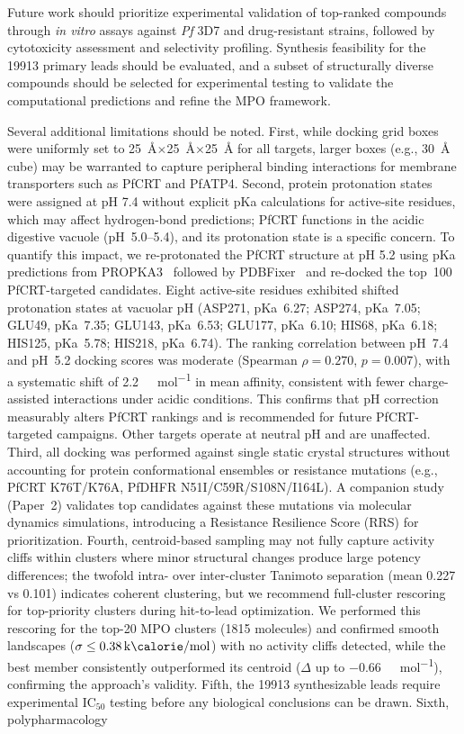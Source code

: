 \documentclass[journal=jcisd8,manuscript=article]{achemso}
\begin{document}
Future work should prioritize experimental validation of top-ranked compounds through \textit{in vitro} assays against \textit{Pf} 3D7 and drug-resistant strains, followed by cytotoxicity assessment and selectivity profiling. Synthesis feasibility for the \num{19913} primary leads should be evaluated, and a subset of structurally diverse compounds should be selected for experimental testing to validate the computational predictions and refine the MPO framework.

Several additional limitations should be noted. First, while docking grid boxes were uniformly set to \qty{25}{\angstrom}$\times$\qty{25}{\angstrom}$\times$\qty{25}{\angstrom} for all targets, larger boxes (e.g., \qty{30}{\angstrom} cube) may be warranted to capture peripheral binding interactions for membrane transporters such as PfCRT and PfATP4. Second, protein protonation states were assigned at pH 7.4 without explicit pKa calculations for active-site residues, which may affect hydrogen-bond predictions; PfCRT functions in the acidic digestive vacuole (pH~5.0--5.4), and its protonation state is a specific concern. To quantify this impact, we re-protonated the PfCRT structure at pH 5.2 using pKa predictions from PROPKA3~\cite{Olsson2011} followed by PDBFixer~\cite{Eastman2017} and re-docked the top~100 PfCRT-targeted candidates. Eight active-site residues exhibited shifted protonation states at vacuolar pH (ASP271, pKa~6.27; ASP274, pKa~7.05; GLU49, pKa~7.35; GLU143, pKa~6.53; GLU177, pKa~6.10; HIS68, pKa~6.18; HIS125, pKa~5.78; HIS218, pKa~6.74). The ranking correlation between pH~7.4 and pH~5.2 docking scores was moderate (Spearman $\rho = \num{0.270}$, $p = \num{0.007}$), with a systematic shift of \qty{+2.2}{\kilo\calorie\per\mole} in mean affinity, consistent with fewer charge-assisted interactions under acidic conditions. This confirms that pH correction measurably alters PfCRT rankings and is recommended for future PfCRT-targeted campaigns. Other targets operate at neutral pH and are unaffected. Third, all docking was performed against single static crystal structures without accounting for protein conformational ensembles or resistance mutations (e.g., PfCRT K76T/K76A, PfDHFR N51I/C59R/S108N/I164L). A companion study (Paper~2) validates top candidates against these mutations via molecular dynamics simulations, introducing a Resistance Resilience Score (RRS) for prioritization. Fourth, centroid-based sampling may not fully capture activity cliffs within clusters where minor structural changes produce large potency differences; the twofold intra- over inter-cluster Tanimoto separation (mean \num{0.227} vs \num{0.101}) indicates coherent clustering, but we recommend full-cluster rescoring for top-priority clusters during hit-to-lead optimization. We performed this rescoring for the top-20 MPO clusters (\num{1815} molecules) and confirmed smooth landscapes ($\sigma \leq \qty{0.38}{\kilo\calorie\per\mole}$) with no activity cliffs detected, while the best member consistently outperformed its centroid ($\Delta$ up to \qty{-0.66}{\kilo\calorie\per\mole}), confirming the approach's validity. Fifth, the \num{19913} synthesizable leads require experimental IC$_{50}$ testing before any biological conclusions can be drawn. Sixth, polypharmacology 
\end{document}
